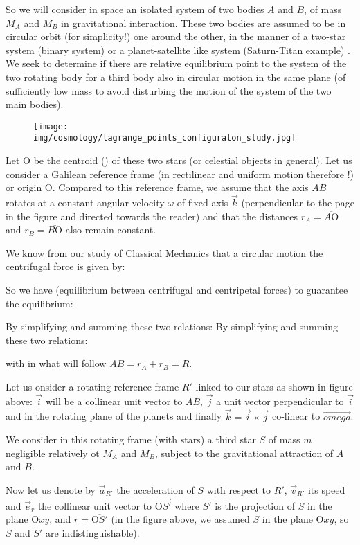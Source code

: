 	So we will consider in space an isolated system of two bodies $A$ and $B$, of mass $M_A$ and $M_B$ in gravitational interaction. These two bodies are assumed to be in circular orbit (for simplicity!) one around the other, in the manner of a two-star system (binary system) or a planet-satellite like system (Saturn-Titan example) . We seek to determine if there are relative equilibrium point to the system of the two rotating body for  a third body also in circular motion in the same plane (of sufficiently low mass to avoid disturbing the motion of the system of the two main bodies).
	\begin{figure}[H]
		\begin{center}
		\texttt{[image: img/cosmology/lagrange\_points\_configuraton\_study.jpg]}
		\end{center}	
	\end{figure}
	Let O be the centroid () of these two stars (or celestial objects in general). Let us consider a Galilean reference frame (in rectilinear and uniform motion therefore !) or origin O. Compared to this reference frame, we assume that the axis $AB$ rotates at a constant angular velocity $\omega$ of fixed axis $\vec{k}$ (perpendicular to the page in the figure and directed towards the reader) and that the distances $r_A=\overline{A\text{O}}$ and $r_B=\overline{B\text{O}}$ also remain constant.
 
 We know from our study of Classical Mechanics that a circular motion the centrifugal force is given by:
	
	So we have (equilibrium between centrifugal and centripetal forces) to guarantee the equilibrium:
	
	By simplifying and summing these two relations:
	By simplifying and summing these two relations:
	
	with in what will follow $AB=r_A+r_B=R$.
	
	Let us onsider a rotating reference frame $R'$ linked to our stars as shown in figure above: $\vec{i}$ will be a collinear unit vector to $AB$, $\vec{j}$ a unit vector perpendicular to $\vec{i}$ and in the rotating plane of the planets and finally $\vec{k}=\vec{i}\times\vec{j}$ co-linear to $\vec{omega}$.

	We consider in this rotating frame (with stars) a third star $S$ of mass $m$ negligible relatively ot $M_A$ and $M_B$, subject to the gravitational attraction of $A$ and $B$.

	Now let us denote by $\vec{a}_{R'}$ the acceleration of $S$ with respect to $R'$, $\vec{v}_{R'}$ its speed and $\vec{e}_r$ the collinear  unit vector to $\overrightarrow{\text{O}S'}$ where $S'$ is the projection of $S$ in the plane O$xy$, and $r=\overline{\text{O}S'}$ (in the figure above, we assumed $S$ in the plane O$xy$, so $S$ and $S'$ are indistinguishable).
	
